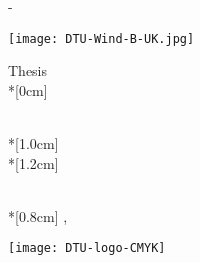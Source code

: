 \thispagestyle{empty}             %
\calccentering{\unitlength}
\begin{adjustwidth*}{\unitlength}{-\unitlength}
    \begin{adjustwidth}{-0.5cm}{-0.5cm}
        \sffamily
        \noindent
        \texttt{[image: DTU-Wind-B-UK.jpg]} \hfill
        \begin{flushright}
        	\thesistypeabbr{} Thesis\\*[0cm]
        \end{flushright}

		\begin{vplace}[1.0]
			\noindent
			\Huge \thesistitle{}\\*[1.0cm]
			\LARGE \thesissubtitle{}\\*[1.2cm]
		\end{vplace}
        
        \noindent
        \parbox[b]{0.5\linewidth}{%
        	\noindent
            \Large 
            \thesisauthor{}\\*[0.8cm]
            \large
            \thesislocation{}, \the\year
        }
        \hfill\texttt{[image: DTU-logo-CMYK]}
    \end{adjustwidth}
\end{adjustwidth*}
\normalfont
\normalsize
